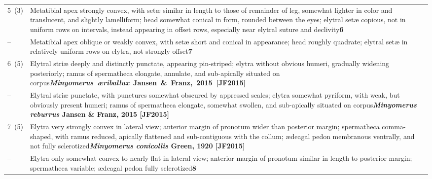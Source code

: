 \documentclass[fleqn,10pt,lineno]{wlpeerj} %
\newcommand{\breakfill}{\dotfill\newline\penalty0\hbox{}\nobreak\dotfill}
\begin{document}
\begin{xtabular}{@{}
                p{\dimexpr.1\textwidth-\tabcolsep\relax}
                p{\dimexpr.9\textwidth-\tabcolsep\relax}@{}}
		{5~(3)} & {Metatibial apex strongly convex, with set{\ae} similar in length to those of remainder of leg, somewhat lighter in color and translucent, and slightly lamelliform; head somewhat conical in form, rounded between the eyes; elytral set{\ae} copious, not in uniform rows on intervals, instead appearing in offset rows, especially near elytral suture and declivity}{\dotfill}{\textbf{6}}\\
		{--} & {Metatibial apex oblique or weakly convex, with set{\ae} short and conical in appearance; head roughly quadrate; elytral set{\ae} in relatively uniform rows on elytra, not strongly offset}{\dotfill}{\textbf{7}}\\
		
		{6~(5)} & {Elytral stri{\ae} deeply and distinctly punctate, appearing pin-striped; elytra without obvious humeri, gradually widening posteriorly; ramus of spermatheca elongate, annulate, and sub-apically situated on corpus}{\dotfill}{\mbox{\textbf{\textit{Minyomerus {\ae}riballux} Jansen \& Franz, 2015 [JF2015]}}}\\
		{--} & {Elytral stri{\ae} punctate, with punctures somewhat obscured by appressed scales; elytra somewhat pyriform, with weak, but obviously present humeri; ramus of spermatheca elongate, somewhat swollen, and sub-apically situated on corpus}{\breakfill}{\textbf{\textit{Minyomerus reburrus} Jansen \& Franz, 2015 [JF2015]}}\\
		
		{7~(5)} & {Elytra very strongly convex in lateral view; anterior margin of pronotum wider than posterior margin; spermatheca comma-shaped, with ramus reduced, apically flattened and sub-contiguous with the collum; {\ae}deagal pedon membranous ventrally, and not fully sclerotized}{\breakfill}{\textbf{\textit{Minyomerus conicollis} Green, 1920 [JF2015]}}\\
		{--} & {Elytra only somewhat convex to nearly flat in lateral view; anterior margin of pronotum similar in length to posterior margin; spermatheca variable; {\ae}deagal pedon fully sclerotized}{\breakfill}{\textbf{8}}\\
		

\end{xtabular}
\end{document}
